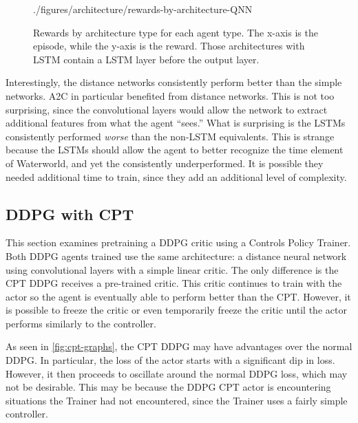 \begin{figure}[!ht]
    {./figures/architecture/rewards-by-architecture-QNN}
    \caption{
        Rewards by architecture type for each agent type.
        The x-axis is the episode, while the y-axis is the reward.
        Those architectures with LSTM contain a LSTM layer before the output layer.
    }
    \label{fig:rewards-by-architecture}
\end{figure}

Interestingly, the distance networks consistently perform better than the simple
networks.
A2C in particular benefited from distance networks.
This is not too surprising, since the convolutional layers would allow the network to
extract additional features from what the agent ``sees.''
What is surprising is the LSTMs consistently performed \textit{worse} than the
non-LSTM equivalents.
This is strange because the LSTMs should allow the agent to better recognize the time
element of Waterworld, and yet the consistently underperformed.
It is possible they needed additional time to train, since they add an additional
level of complexity.

\subsection{DDPG with CPT}\label{subsec:ddpg-with-cpt}
This section examines pretraining a DDPG critic using a Controls Policy Trainer.
Both DDPG agents trained use the same architecture: a distance neural network using
convolutional layers with a simple linear critic.
The only difference is the CPT DDPG receives a pre-trained critic.
This critic continues to train with the actor so the agent is eventually able to
perform better than the CPT\@.
However, it is possible to freeze the critic or even temporarily freeze the critic
until the actor performs similarly to the controller.

As seen in \autoref{fig:cpt-graphs}, the CPT DDPG may have advantages over the normal
DDPG\@.
In particular, the loss of the actor starts with a significant dip in loss.
However, it then proceeds to oscillate around the normal DDPG loss, which may not be
desirable.
This may be because the DDPG CPT actor is encountering situations the Trainer had not
encountered, since the Trainer uses a fairly simple controller.

